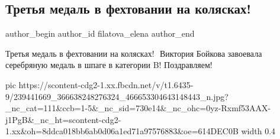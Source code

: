  
 
 
 
 
 
\subsection{Третья медаль в фехтовании на колясках!}
\label{sec:26_08_2021.fb.filatova_elena.1.fehtovanie_medal}
 
\ifcmt
 author_begin
   author_id filatova_elena
 author_end
\fi

Третья медаль в фехтовании на колясках!
⁣
Виктория Бойкова завоевала серебряную медаль в шпаге в категории B! Поздравляем!

\ifcmt
  pic https://scontent-cdg2-1.xx.fbcdn.net/v/t1.6435-9/239441669_366638248276324_466653304643148443_n.jpg?_nc_cat=111&ccb=1-5&_nc_sid=730e14&_nc_ohc=0yz-Rxmf53AAX-j1PgB&_nc_ht=scontent-cdg2-1.xx&oh=8ddca018bb6ab0d06a1ed71a97576883&oe=614DEC0B
  width 0.4
\fi
